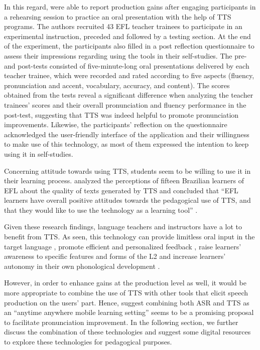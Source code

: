 \documentclass[english]{textolivre}
\begin{document}
In this regard, \textcite{eksi2016} were able to report production gains after engaging participants in a rehearsing session to practice an oral presentation with the help of TTS programs. The authors recruited 43 EFL teacher trainees to participate in an experimental instruction, preceded and followed by a testing section. At the end of the experiment, the participants also filled in a post reflection questionnaire to assess their impressions regarding using the tools in their self-studies. The pre- and post-tests consisted of five-minute-long oral presentations delivered by each teacher trainee, which were recorded and rated according to five aspects (fluency, pronunciation and accent, vocabulary, accuracy, and content). The scores obtained from the tests reveal a significant difference when analyzing the teacher trainees’ scores and their overall pronunciation and fluency performance in the post-test, suggesting that TTS was indeed helpful to promote pronunciation improvements. Likewise, the participants’ reflection on the questionnaire acknowledged the user-friendly interface of the application and their willingness to make use of this technology, as most of them expressed the intention to keep using it in self-studies.

Concerning attitude towards using TTS, students seem to be willing to use it in their learning process. \textcite{bione2016} analyzed the perceptions of fifteen Brazilian learners of EFL about the quality of texts generated by TTS and concluded that “EFL learners have overall positive attitudes towards the pedagogical use of TTS, and that they would like to use the technology as a learning tool” \cite[p. 50]{bione2016}.

Given these research findings, language teachers and instructors have a lot to benefit from TTS. As seen, this technology can provide limitless oral input in the target language \cite{cardoso2015}, promote efficient and personalized feedback \cite{cardoso2018}, raise learners’ awareness to specific features and forms of the L2 \cite{liakin2017, araujogomes2018} and increase learners’ autonomy in their own phonological development \cite{moon2012, liakin2017}.

However, in order to enhance gains at the production level as well, it would be more appropriate to combine the use of TTS with other tools that elicit speech production on the users’ part. Hence, \textcite{liakin2017} suggest combining both ASR and TTS as an “anytime anywhere mobile learning setting” seems to be a promising proposal to facilitate pronunciation improvement. In the following section, we further discuss the combination of these technologies and suggest some digital resources to explore these technologies for pedagogical purposes.
\end{document}
